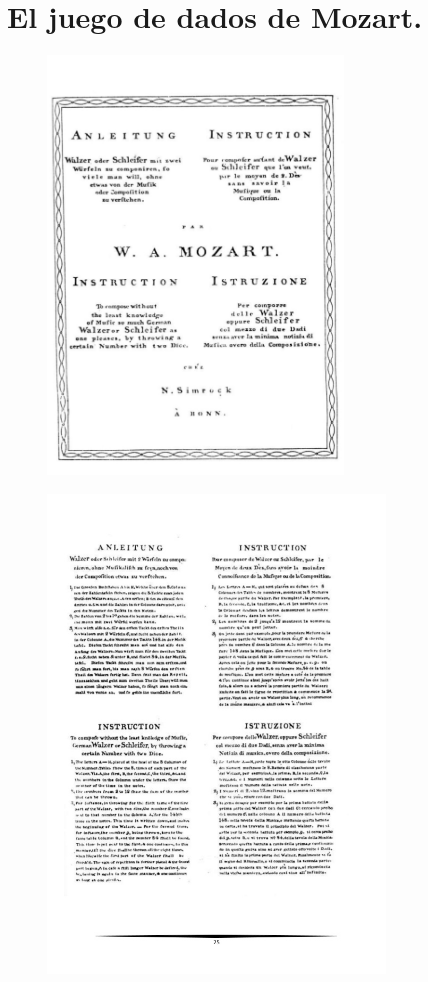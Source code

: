 \documentclass[a4paper, openright, 11pt, titlepage]{report}
\theoremstyle{definition}\newtheorem{defin}[propo]{Definition}
\theoremstyle{definition}\newtheorem{obser}[propo]{Remark}
\theoremstyle{definition}\newtheorem{ejem}[propo]{Ejemplo}
\theoremstyle{definition}\newtheorem{algoritmo}[propo]{Algoritmo}
\begin{document}
\chapter{El juego de dados de Mozart.}
\begin{figure}[H]
    \centering
    \includegraphics[width = 0.7\textwidth]{Images/Apéndices/Apéndice E/mozart1.png}
\end{figure}
\begin{figure}[H]
    \centering
    \includegraphics[width = 0.8\textwidth]{Images/Apéndices/Apéndice E/mozart2.png}
\end{figure}
\end{document}
